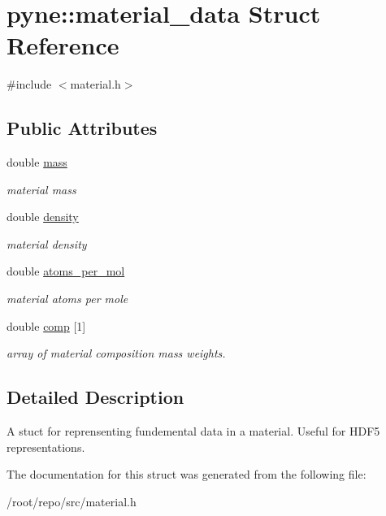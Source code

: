 \hypertarget{structpyne_1_1material__data}{}\section{pyne\+:\+:material\+\_\+data Struct Reference}
\label{structpyne_1_1material__data}


{\ttfamily \#include $<$material.\+h$>$}

\subsection*{Public Attributes}
\begin{DoxyCompactItemize}
\item 
\mbox{\label{structpyne_1_1material__data_a8e5fa2bf074f5c7770fcefca825640b9}} 
double \hyperlink{structpyne_1_1material__data_a8e5fa2bf074f5c7770fcefca825640b9}{mass}
\begin{DoxyCompactList}\small\item\em material mass \end{DoxyCompactList}\item 
\mbox{\label{structpyne_1_1material__data_adf19d9e0612f5ea9c6093ad09c63eee4}} 
double \hyperlink{structpyne_1_1material__data_adf19d9e0612f5ea9c6093ad09c63eee4}{density}
\begin{DoxyCompactList}\small\item\em material density \end{DoxyCompactList}\item 
\mbox{\label{structpyne_1_1material__data_a135b69d35e0bc6c49a025a24cb153798}} 
double \hyperlink{structpyne_1_1material__data_a135b69d35e0bc6c49a025a24cb153798}{atoms\+\_\+per\+\_\+mol}
\begin{DoxyCompactList}\small\item\em material atoms per mole \end{DoxyCompactList}\item 
\mbox{\label{structpyne_1_1material__data_ac7c972f03200ebea0a958d28d73d7af9}} 
double \hyperlink{structpyne_1_1material__data_ac7c972f03200ebea0a958d28d73d7af9}{comp} \mbox{[}1\mbox{]}
\begin{DoxyCompactList}\small\item\em array of material composition mass weights. \end{DoxyCompactList}\end{DoxyCompactItemize}


\subsection{Detailed Description}
A stuct for reprensenting fundemental data in a material. Useful for H\+D\+F5 representations. 

The documentation for this struct was generated from the following file\+:\begin{DoxyCompactItemize}
\item 
/root/repo/src/material.\+h\end{DoxyCompactItemize}
